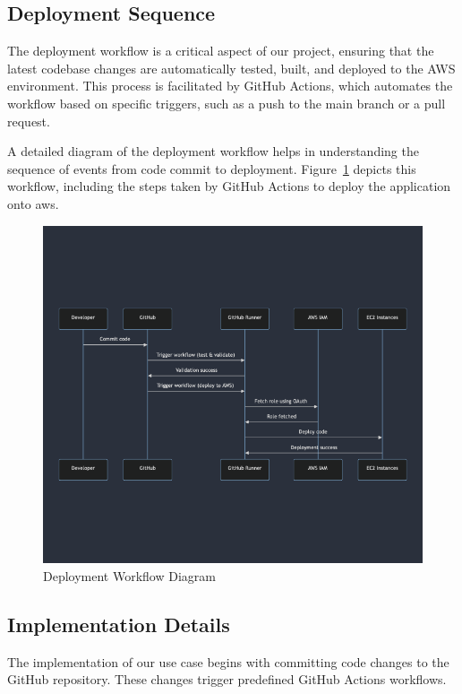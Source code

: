 \newpage
\subsection{Deployment Sequence}
The deployment workflow is a critical aspect of our project, ensuring that the latest codebase changes are automatically tested, built, and deployed to the AWS environment. This process is facilitated by GitHub Actions, which automates the workflow based on specific triggers, such as a push to the main branch or a pull request.

A detailed diagram of the deployment workflow helps in understanding the sequence of events from code commit to deployment. Figure~\ref{fig:deployment-workflow-diagram} depicts this workflow, including the steps taken by GitHub Actions to deploy the application onto \gls{aws}.

\begin{figure}[H]
    \centering
    \includegraphics[width=\textwidth]{figures/sequence.png}
    \caption{Deployment Workflow Diagram}
    \label{fig:deployment-workflow-diagram}
\end{figure}

\subsection{Implementation Details}
The implementation of our use case begins with committing code changes to the GitHub repository. These changes trigger predefined GitHub Actions workflows.

